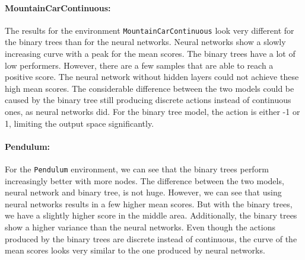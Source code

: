 \paragraph*{MountainCarContinuous:} The results for the environment \verb|MountainCarContinuous| look very different for the binary trees than for the neural networks. Neural networks show a slowly increasing curve with a peak for the mean scores. The binary trees have a lot of low performers. However, there are a few samples that are able to reach a positive score. The neural network without hidden layers could not achieve these high mean scores. The considerable difference between the two models could be caused by the binary tree still producing discrete actions instead of continuous ones, as neural networks did. For the binary tree model, the action is either -1 or 1, limiting the output space significantly.

\paragraph*{Pendulum:} For the \verb|Pendulum| environment, we can see that the binary trees perform increasingly better with more nodes. The difference between the two models, neural network and binary tree, is not huge. However, we can see that using neural networks results in a few higher mean scores. But with the binary trees, we have a slightly higher score in the middle area. Additionally, the binary trees show a higher variance than the neural networks. Even though the actions produced by the binary trees are discrete instead of continuous, the curve of the mean scores looks very similar to the one produced by neural networks.


